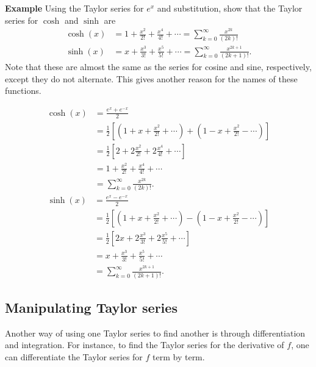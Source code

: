 \documentclass[twoside,openright,titlepage,a4paper]{book}
\begin{document}
\begin{sloppypar}
\textbf{Example} Using the Taylor series for $e^x$ and substitution, show that the Taylor series for $\cosh$ and $\sinh$ are
\begin{align*}
\cosh(x) &= 1 + \frac{x^2}{2!} + \frac{x^4}{4!} + \dotsb = \sum_{k=0}^\infty \frac{x^{2k}}{(2k)!} \\
\sinh(x) &= x + \frac{x^3}{3!} + \frac{x^5}{5!} + \dotsb = \sum_{k=0}^\infty \frac{x^{2k+1}}{(2k+1)!}. \end{align*}
Note that these are almost the same as the series for cosine and sine, respectively, except they do not alternate. This gives another reason for the names of these functions.\\
\begin{examplebox}
\begin{align*}
\cosh(x) &= \frac{e^x + e^{-x}}{2} \\
&= \frac{1}{2}\left[(1+x+\frac{x^2}{2!} + \dotsb)+(1-x+\frac{x^2}{2!}-\dotsb)\right] \\
&= \frac{1}{2}\left[2 + 2 \frac{x^2}{2!} + 2 \frac{x^4}{4!} +\dotsb \right] \\
&= 1+\frac{x^2}{2!} + \frac{x^4}{4!}+\dotsb \\
&= \sum_{k=0}^\infty \frac{x^{2k}}{(2k)!}.
\end{align*}
\begin{align*}
\sinh(x) &= \frac{e^x - e^{-x}}{2} \\
&= \frac{1}{2}\left[(1+x+\frac{x^2}{2!} + \dotsb)-(1-x+\frac{x^2}{2!}-\dotsb)\right] \\
&= \frac{1}{2}\left[2x + 2 \frac{x^3}{3!} + 2 \frac{x^5}{5!} +\dotsb \right] \\
&= x+\frac{x^3}{3!} + \frac{x^5}{5!}+\dotsb \\
&= \sum_{k=0}^\infty \frac{x^{2k+1}}{(2k+1)!}.
\end{align*}
\end{examplebox}

\subsection{Manipulating Taylor series}
Another way of using one Taylor series to find another is through differentiation and integration. For instance, to find the Taylor series for the derivative of $f$, one can differentiate the Taylor series for $f$ term by term.


\end{sloppypar}
\end{document}
